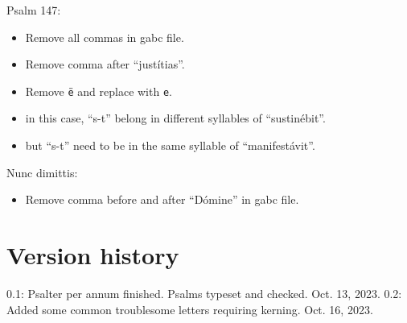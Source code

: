 \documentclass[11pt]{article}
\begin{document}
  
    Psalm 147:
  \begin{itemize}
      \item Remove all commas in gabc file.
          \item Remove comma after ``justítias''.
    \item Remove \texttt{ë} and replace with \texttt{e}.
    \item in this case, ``s-t'' belong in different syllables of ``sustinébit''.
    \item but ``s-t'' need to be in the same syllable of ``manifestávit''.
  
    \end{itemize}
    
    Nunc dimittis:
    
      \begin{itemize}
  \item Remove comma before and after ``Dómine'' in gabc file.
  
  \end{itemize}
  
  \section{Version history}
0.1: Psalter per annum finished. Psalms typeset and checked. Oct. 13, 2023.
0.2: Added some common troublesome letters requiring kerning. Oct. 16, 2023. 
\end{document}
